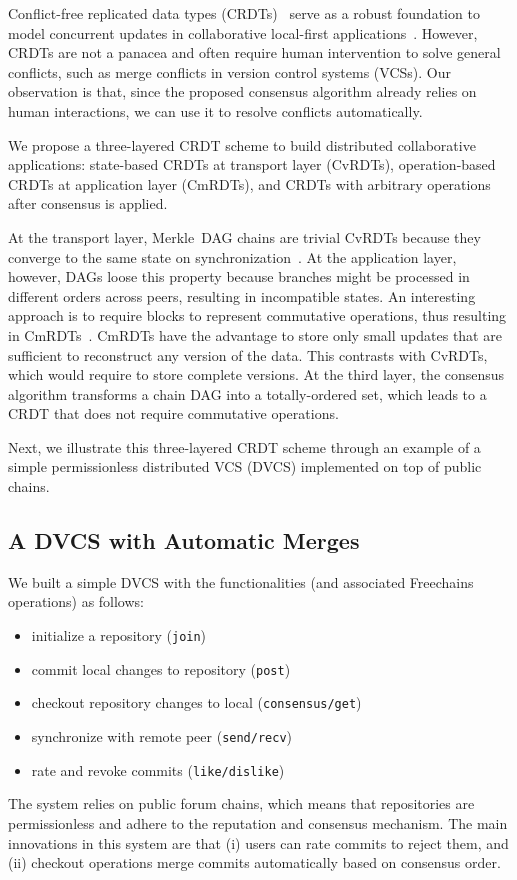 \documentclass[10pt,journal,compsoc]{IEEEtran}
\newcommand{\FC}       {Freechains\xspace}
\newcommand{\code}[1]  {\texttt{\footnotesize{#1}}}
\begin{document}
Conflict-free replicated data types (CRDTs)~\cite{p2p.crdts} serve as a robust
foundation to model concurrent updates in collaborative local-first
applications~\cite{p2p.local}.
However, CRDTs are not a panacea and often require human intervention to solve
general conflicts, such as merge conflicts in version control systems (VCSs).
%
Our observation is that, since the proposed consensus algorithm already relies
on human interactions, we can use it to resolve conflicts automatically.

We propose a three-layered CRDT scheme to build distributed collaborative
applications:
    state-based CRDTs at transport layer (CvRDTs),
    operation-based CRDTs at application layer (CmRDTs), and
    CRDTs with arbitrary operations after consensus is applied.

At the transport layer, Merkle~DAG chains are trivial CvRDTs because they
converge to the same state on synchronization~\cite{p2p.merkle-crdts}.
%
At the application layer, however, DAGs loose this property because branches
might be processed in different orders across peers, resulting in incompatible
states.
An interesting approach is to require blocks to represent commutative
operations, thus resulting in CmRDTs~\cite{p2p.merkle-crdts}.
%
CmRDTs have the advantage to store only small updates that are sufficient to
reconstruct any version of the data.
This contrasts with CvRDTs, which would require to store complete versions.
%
At the third layer, the consensus algorithm transforms a chain DAG into a
totally-ordered set, which leads to a CRDT that does not require commutative
operations.

Next, we illustrate this three-layered CRDT scheme through an example of a
simple permissionless distributed VCS (DVCS) implemented on top of public
chains.

\subsection{A DVCS with Automatic Merges}

We built a simple DVCS with the functionalities (and associated \FC
operations) as follows:
%
\begin{itemize}
    \setlength{\itemindent}{-8pt}
    \item initialize a repository (\code{join})
    \item commit local changes to repository (\code{post})
    \item checkout repository changes to local (\code{consensus/get})
    \item synchronize with remote peer (\code{send/recv})
    \item rate and revoke commits (\code{like/dislike})
\end{itemize}
%
The system relies on public forum chains, which means that repositories are
permissionless and adhere to the reputation and consensus mechanism.
The main innovations in this system are that
    (i)  users can rate commits to reject them, and
    (ii) checkout operations merge commits automatically based on consensus order.
\end{document}
